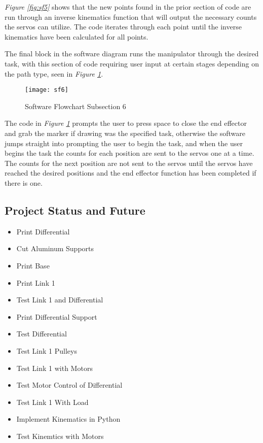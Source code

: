 \emph{Figure \ref{fig:sf5}} shows that the new points found in the prior section of code are run through an inverse kinematics function that will output the necessary counts the servos can utilize. The code iterates through each point until the inverse kinematics have been calculated for all points.

The final block in the software diagram runs the manipulator through the desired task, with this section of code requiring user input at certain stages depending on the path type, seen in \emph{Figure \ref{fig:sf6}}.
\begin{figure}[htp]
  \center
  \texttt{[image: sf6]}
  \caption[]{Software Flowchart Subsection 6}
  \label{fig:sf6}
\end{figure}

The code in \emph{Figure \ref{fig:sf6}} prompts the user to press space to close the end effector and grab the marker if drawing was the specified task, otherwise the software jumps straight into prompting the user to begin the task, and when the user begins the task the counts for each position are sent to the servos one at a time. The counts for the next position are not sent to the servos until the servos have reached the desired positions and the end effector function has been completed if there is one.

% 
\newpage
\subsection{Project Status and Future}
\begin{itemize}[label=---]
  \item Print Differential
  \item Cut Aluminum Supports
  \item Print Base
  \item Print Link 1
  \item Test Link 1 and Differential
  \item Print Differential Support
  \item Test Differential
  \item Test Link 1 Pulleys
  \item Test Link 1 with Motors
  \item Test Motor Control of Differential
  \item Test Link 1 With Load
  \item Implement Kinematics in Python
  \item Test Kinemtics with Motors
\end{itemize}
% 
\newpage

